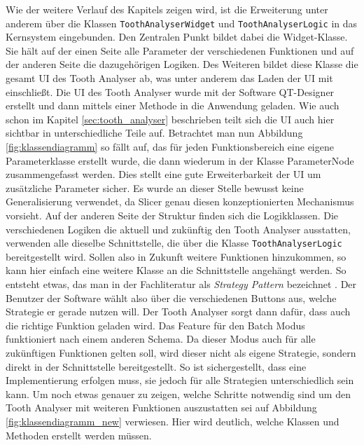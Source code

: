 Wie der weitere Verlauf des Kapitels zeigen wird, ist die Erweiterung unter anderem
über die Klassen \texttt{ToothAnalyserWidget} und \texttt{ToothAnalyserLogic} in
das Kernsystem eingebunden. Den Zentralen Punkt bildet dabei die Widget-Klasse. Sie
hält auf der einen Seite alle Parameter der verschiedenen Funktionen und auf der
anderen Seite die dazugehörigen Logiken. Des Weiteren bildet diese Klasse die
gesamt \ac{UI} des Tooth Analyser ab, was unter anderem das Laden der \ac{UI} mit
einschließt. Die \ac{UI} des Tooth Analyser wurde mit der Software QT-Designer erstellt
und dann mittels einer Methode in die Anwendung geladen. Wie auch schon im
Kapitel \ref{sec:tooth_analyser} beschrieben teilt sich die \ac{UI} auch hier sichtbar
in unterschiedliche Teile auf. Betrachtet man nun Abbildung
\ref{fig:klassendiagramm} so fällt auf, das für jeden Funktionsbereich eine eigene
Parameterklasse erstellt wurde, die dann wiederum in der Klasse ParameterNode
zusammengefasst werden. Dies stellt eine gute Erweiterbarkeit der \ac{UI} um
zusätzliche Parameter sicher. Es wurde an dieser Stelle bewusst keine Generalisierung
verwendet, da Slicer genau diesen konzeptionierten Mechanismus vorsieht. Auf der
anderen Seite der Struktur finden sich die Logikklassen. Die verschiedenen
Logiken die aktuell und zukünftig den Tooth Analyser ausstatten, verwenden alle dieselbe
Schnittstelle, die über die Klasse \texttt{ToothAnalyserLogic} bereitgestellt wird.
Sollen also in Zukunft weitere Funktionen hinzukommen, so kann hier einfach eine
weitere Klasse an die Schnittstelle angehängt werden. So entsteht etwas, das man
in der Fachliteratur als \textit{Strategy Pattern} bezeichnet \citep[vgl.][S.~99]{siebler2014}.
Der Benutzer der Software wählt also über die verschiedenen Buttons aus, welche Strategie
er gerade nutzen will. Der Tooth Analyser sorgt dann dafür, dass auch die richtige
Funktion geladen wird. Das Feature für den Batch Modus funktioniert nach einem
anderen Schema. Da dieser Modus auch für alle zukünftigen Funktionen gelten soll,
wird dieser nicht als eigene Strategie, sondern direkt in der Schnittstelle bereitgestellt.
So ist sichergestellt, dass eine Implementierung erfolgen muss, sie jedoch für
alle Strategien unterschiedlich sein kann. Um noch etwas genauer zu zeigen,
welche Schritte notwendig sind um den Tooth Analyser mit weiteren Funktionen
auszustatten sei auf Abbildung \ref{fig:klassendiagramm_new} verwiesen. Hier wird
deutlich, welche Klassen und Methoden erstellt werden müssen.

